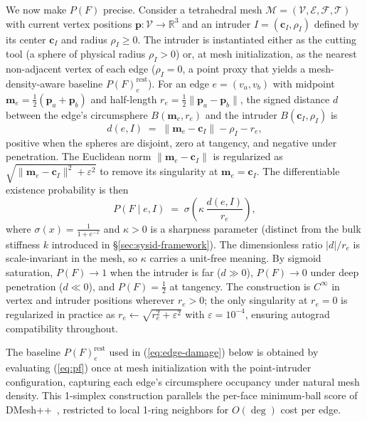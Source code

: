 We now make $P(F)$ precise. Consider a tetrahedral mesh
$\mathcal{M} = (\mathcal{V}, \mathcal{E}, \mathcal{F}, \mathcal{T})$
with current vertex positions $\mathbf{p}: \mathcal{V} \to \mathbb{R}^3$
and an intruder $I = (\mathbf{c}_I, \rho_I)$ defined by its center
$\mathbf{c}_I$ and radius $\rho_I \!\geq\! 0$. The intruder is
instantiated either as the cutting tool (a sphere of physical radius
$\rho_I \!>\! 0$) or, at mesh initialization, as the nearest
non-adjacent vertex of each edge ($\rho_I \!=\! 0$, a point proxy
that yields a mesh-density-aware baseline $P(F)_e^{\text{rest}}$).
For an edge $e = (v_a, v_b)$ with midpoint
$\mathbf{m}_e = \tfrac{1}{2}(\mathbf{p}_a + \mathbf{p}_b)$ and
half-length $r_e = \tfrac{1}{2}\|\mathbf{p}_a - \mathbf{p}_b\|$, the
signed distance $d$ between the edge's circumsphere
$B(\mathbf{m}_e, r_e)$ and the intruder $B(\mathbf{c}_I, \rho_I)$ is
\begin{equation}
  d(e, I) \;=\; \|\mathbf{m}_e - \mathbf{c}_I\| - \rho_I - r_e ,
  \label{eq:sdist}
\end{equation}
positive when the spheres are disjoint, zero at tangency, and negative
under penetration. The Euclidean norm $\|\mathbf{m}_e - \mathbf{c}_I\|$
is regularized as $\sqrt{\|\mathbf{m}_e - \mathbf{c}_I\|^2 + \varepsilon^2}$
to remove its singularity at $\mathbf{m}_e \!=\! \mathbf{c}_I$. The differentiable existence probability is then
\begin{equation}
  P(F \mid e, I)
  \;=\; \sigma\!\left(\kappa\,\frac{d(e, I)}{r_e}\right) ,
  \label{eq:pf}
\end{equation}
where $\sigma(x) = \frac{1}{1+e^{-x}}$ and $\kappa > 0$ is a sharpness
parameter (distinct from the bulk stiffness $k$ introduced in
\S\ref{sec:sysid-framework}). The dimensionless ratio $|d|/r_e$ is
scale-invariant in the mesh, so $\kappa$ carries a unit-free meaning.
By sigmoid saturation, $P(F) \to 1$ when the intruder is far
($d \gg 0$), $P(F) \to 0$ under deep penetration ($d \ll 0$), and
$P(F) = \tfrac{1}{2}$ at tangency. The construction is $C^\infty$ in
vertex and intruder positions wherever $r_e > 0$; the only singularity
at $r_e = 0$ is regularized in practice as
$r_e \!\leftarrow\! \sqrt{r_e^2 + \varepsilon^2}$ with
$\varepsilon \!=\! 10^{-4}$, ensuring autograd compatibility throughout.

The baseline $P(F)_e^{\text{rest}}$ used in (\ref{eq:edge-damage})
below is obtained by evaluating (\ref{eq:pf}) once at mesh
initialization with the point-intruder configuration, capturing each
edge's circumsphere occupancy under natural mesh density. This
1-simplex construction parallels the per-face minimum-ball score of
DMesh++~\cite{son2025dmesh2}, restricted to local 1-ring neighbors
for $O(\deg)$ cost per edge.

